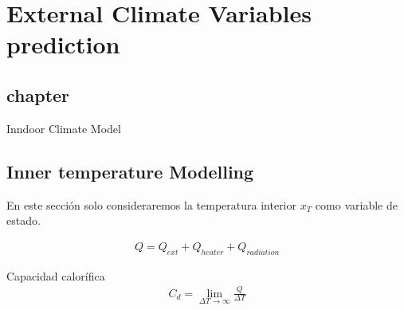 
    \chapter{External Climate Variables prediction}

    \section{chapter}{Inndoor Climate Model}

    
    \section{Inner temperature Modelling}

    En este sección solo consideraremos la temperatura interior $x_{T}$ como variable de estado.
    
    \begin{gather}
        Q = Q_{ext} + Q_{heater} + Q_{radiation}
    \end{gather}
    
    Capacidad calorífica 
    \begin{gather}
        C_d = \lim_{\Delta T \to \infty}\frac{Q}{\Delta T}
    \end{gather}
    
